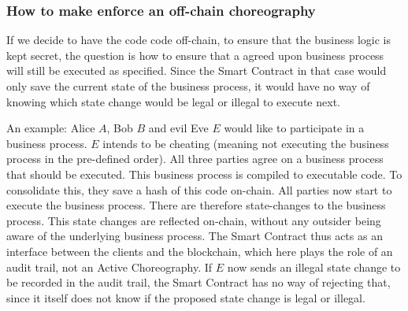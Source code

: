 \documentclass[runningheads]{llncs}
\newcommand{\comment}[1]{}
\begin{document}
\subsubsection{How to make enforce an off-chain choreography}

If we decide to have the code code off-chain, to ensure that the business logic is kept secret, the question is how to ensure that a agreed upon business process will still be executed as specified. Since the Smart Contract in that case would only save the current state of the business process, it would have no way of knowing which state change would be legal or illegal to execute next.

An example: Alice $A$, Bob $B$ and evil Eve $E$ would like to participate in a business process. $E$ intends to be cheating (meaning not executing the business process in the pre-defined order). All three parties agree on a business process that should be executed. This business process is compiled to executable code. To consolidate this, they save a hash of this code on-chain. All parties now start to execute the business process. There are therefore state-changes to the business process. This state changes are reflected on-chain, without any outsider being aware of the underlying business process. The Smart Contract thus acts as an interface between the clients and the blockchain, which here plays the role of an audit trail, not an Active Choreography. If $E$ now sends an illegal state change to be recorded in the audit trail, the Smart Contract has no way of rejecting that, since it itself does not know if the proposed state change is legal or illegal.

\comment{
A technique to avoid this is introduced by parity \footnote{https://wiki.parity.io/Private-Transactions}: In their implementation before a client can communicate with the blockchain, it has to validate its communication with a validator. \textit{How does the chain know that the validator has validated the client? Assumption: It will check the signature of the client and the validator and know that this validator is responsible for that client.}. To avoid all this overhead and to make communication more private, we propose to use a ring signature. Ring signatures were first introduced in 2001 by Rivest et al. and make it possible to specify a group of possible signers without giving away who the actual author of a signed message is \ref{rivest2001leak}. Ring signatures are already used in combination with blockchain technology, among others the CrypoNote protocol used in the Monero network \ref{van2013cryptonote}. In the protocol, a participant can not know from who or to who he or she is sending money or is receiving money from, only that the sender or receiver is part of a one-time ring signature.
}
\end{document}
